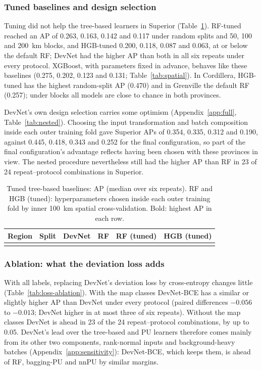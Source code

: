 \documentclass[pdflatex,sn-apa]{sn-jnl}
\begin{document}
\subsubsection{Tuned baselines and design selection}\label{sec:res-controls}

Tuning did not help the tree-based learners in Superior (Table~\ref{tab:controls}). RF-tuned reached an AP of 0.263, 0.163, 0.142 and 0.117 under random splits and 50, 100 and 200~km blocks, and HGB-tuned 0.200, 0.118, 0.087 and 0.063, at or below the default RF; DevNet had the higher AP than both in all six repeats under every protocol. XGBoost, with parameters fixed in advance, behaves like these baselines (0.275, 0.202, 0.123 and 0.131; Table~\ref{tab:spatial}). In Cordillera, HGB-tuned has the highest random-split AP (0.470) and in Grenville the default RF (0.257); under blocks all models are close to chance in both provinces.

DevNet's own design selection carries some optimism (Appendix~\ref{app:full}, Table~\ref{tab:nested}). Choosing the input transformation and batch composition inside each outer training fold gave Superior APs of 0.354, 0.335, 0.312 and 0.190, against 0.445, 0.418, 0.343 and 0.252 for the final configuration, so part of the final configuration's advantage reflects having been chosen with these provinces in view. The nested procedure nevertheless still had the higher AP than RF in 23 of 24 repeat--protocol combinations in Superior.

\begin{table}[t]
\caption{Tuned tree-based baselines: AP (median over six repeats). RF and HGB (tuned): hyperparameters chosen inside each outer training fold by inner 100~km spatial cross-validation. Bold: highest AP in each row.}\label{tab:controls}
\footnotesize
\setlength{\tabcolsep}{3pt}
\begin{tabular*}{\textwidth}{@{\extracolsep\fill}llcccc}
\toprule
Region & Split & DevNet & RF & RF (tuned) & HGB (tuned) \\
\midrule
\botrule
\end{tabular*}
\end{table}

\subsubsection{Ablation: what the deviation loss adds}\label{sec:res-ablation}

With all labels, replacing DevNet's deviation loss by cross-entropy changes little (Table~\ref{tab:loss-ablation}). With the map classes DevNet-BCE has a similar or slightly higher AP than DevNet under every protocol (paired differences $-0.056$ to $-0.013$; DevNet higher in at most three of six repeats). Without the map classes DevNet is ahead in 23 of the 24 repeat--protocol combinations, by up to 0.05. DevNet's lead over the tree-based and PU learners therefore comes mainly from its other two components, rank-normal inputs and background-heavy batches (Appendix~\ref{app:sensitivity}): DevNet-BCE, which keeps them, is ahead of RF, bagging-PU and nnPU by similar margins.
\end{document}
